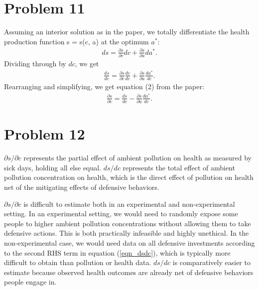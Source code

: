 \documentclass[12pt]{article}
\begin{document}
\section*{Problem 11}
Assuming an interior solution as in the paper, we totally differentiate the health production function s = s(c, a) at the optimum $a^*$:
\begin{align}
	ds = \frac{\partial s}{\partial c} dc + \frac{\partial s}{\partial a} da^*.
\end{align}
Dividing through by $dc$, we get
\begin{align}
	\frac{ds}{dc} = \frac{\partial s}{\partial c} \frac{dc}{dc} + \frac{\partial s}{\partial a} \frac{da^*}{dc}.
\end{align}
Rearranging and simplifying, we get equation (2) from the paper:
\begin{align} \label{eqn_dsdc}
	\frac{\partial s}{\partial c} = \frac{ds}{dc} - \frac{\partial s}{\partial a} \frac{da^*}{dc}.
\end{align}

\section*{Problem 12}
$\partial s/\partial c$ represents the partial effect of ambient pollution on health as measured by sick days, holding all else equal. $d s/ dc$ represents the total effect of ambient pollution concentration on health, which is the direct effect of pollution on health net of the mitigating effects of defensive behaviors.

 $\partial s / \partial c$ is difficult to estimate both in an experimental and non-experimental setting. In an experimental setting, we would need to randomly expose some people to higher ambient pollution concentrations without allowing them to take defensive actions. This is both practically infeasible and highly unethical. In the non-experimental case, we would need data on all defensive investments according to the second RHS term in equation (\ref{eqn_dsdc}), which is typically more difficult to obtain than pollution or health data. $ds / dc$ is comparatively easier to estimate because observed health outcomes are already net of defensive behaviors people engage in.
\end{document}
